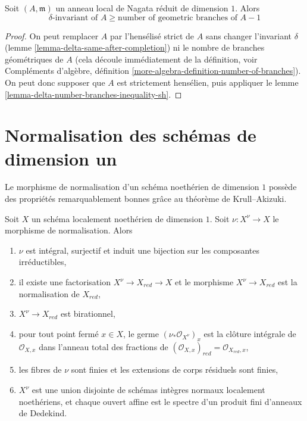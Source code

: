 \begin{lemma}
\label{lemma-delta-number-branches-inequality}
Soit $(A, \mathfrak m)$ un anneau local de Nagata réduit de dimension $1$. Alors
$$
\delta\text{-invariant of }A \geq \text{number of geometric branches of }A - 1
$$
\end{lemma}

\begin{proof}
On peut remplacer $A$ par l'hensélisé strict de $A$ sans
changer l'invariant $\delta$
(lemme \ref{lemma-delta-same-after-completion}) ni
le nombre de branches géométriques de $A$
(cela découle immédiatement de la définition, voir
Compléments d'algèbre, définition \ref{more-algebra-definition-number-of-branches}).
On peut donc supposer que $A$ est strictement hensélien, puis
appliquer le lemme \ref{lemma-delta-number-branches-inequality-sh}.
\end{proof}






\section{Normalisation des schémas de dimension un}
\label{section-normalization-one-dimensional}

\noindent
Le morphisme de normalisation d'un schéma noethérien de dimension
$1$ possède des propriétés remarquablement bonnes grâce au théorème de Krull--Akizuki.

\begin{lemma}
\label{lemma-normalize-noetherian-dim-1}
Soit $X$ un schéma localement noethérien de dimension $1$.
Soit $\nu : X^\nu \to X$ le morphisme de normalisation. Alors
\begin{enumerate}
\item $\nu$ est intégral, surjectif et induit une bijection
sur les composantes irréductibles,
\item il existe une factorisation $X^\nu \to X_{red} \to X$
et le morphisme $X^\nu \to X_{red}$ est la normalisation
de $X_{red}$,
\item $X^\nu \to X_{red}$ est birationnel,
\item pour tout point fermé $x \in X$, le germe
$(\nu_*\mathcal{O}_{X^\nu})_x$ est la clôture intégrale
de $\mathcal{O}_{X, x}$ dans l'anneau total des fractions
de $(\mathcal{O}_{X, x})_{red} = \mathcal{O}_{X_{red}, x}$,
\item les fibres de $\nu$ sont finies et les extensions de
corps résiduels sont finies,
\item $X^\nu$ est une union disjointe de schémas intègres normaux
localement noethériens, et chaque ouvert affine est le spectre d'un produit
fini d'anneaux de Dedekind.
\end{enumerate}
\end{lemma}

